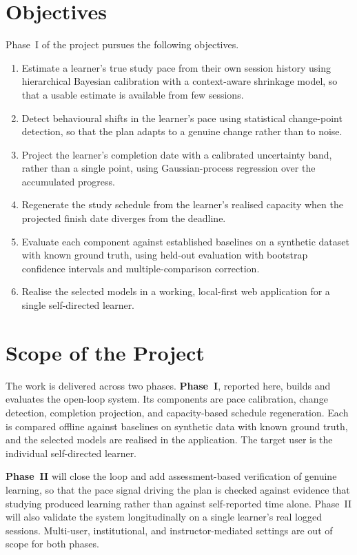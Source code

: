 \section{Objectives}
Phase~I of the project pursues the following objectives.
\begin{enumerate}[noitemsep]
    \item Estimate a learner's true study pace from their own session history using hierarchical Bayesian calibration with a context-aware shrinkage model, so that a usable estimate is available from few sessions.
    \item Detect behavioural shifts in the learner's pace using statistical change-point detection, so that the plan adapts to a genuine change rather than to noise.
    \item Project the learner's completion date with a calibrated uncertainty band, rather than a single point, using Gaussian-process regression over the accumulated progress.
    \item Regenerate the study schedule from the learner's realised capacity when the projected finish date diverges from the deadline.
    \item Evaluate each component against established baselines on a synthetic dataset with known ground truth, using held-out evaluation with bootstrap confidence intervals and multiple-comparison correction.
    \item Realise the selected models in a working, local-first web application for a single self-directed learner.
\end{enumerate}

\section{Scope of the Project}
The work is delivered across two phases. \textbf{Phase~I}, reported here, builds and evaluates the open-loop system. Its components are pace calibration, change detection, completion projection, and capacity-based schedule regeneration. Each is compared offline against baselines on synthetic data with known ground truth, and the selected models are realised in the application. The target user is the individual self-directed learner.

\textbf{Phase~II} will close the loop and add assessment-based verification of genuine learning, so that the pace signal driving the plan is checked against evidence that studying produced learning rather than against self-reported time alone. Phase~II will also validate the system longitudinally on a single learner's real logged sessions. Multi-user, institutional, and instructor-mediated settings are out of scope for both phases.

